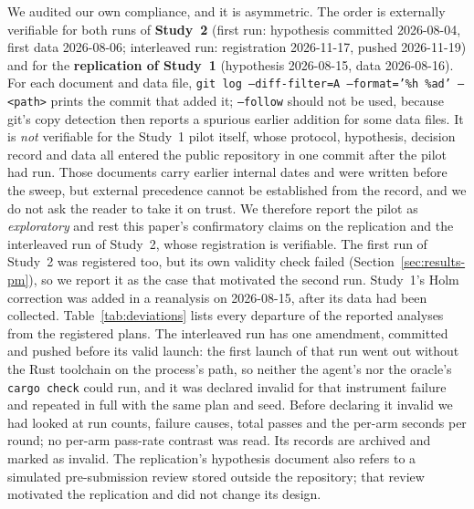 \documentclass[smallcondensed,natbib]{svjour3}
\begin{document}
We audited our own compliance, and it is asymmetric. The order is
externally verifiable for both runs of \textbf{Study~2} (first run:
hypothesis committed 2026-08-04, first data 2026-08-06; interleaved
run: registration 2026-11-17, pushed 2026-11-19) and for the
\textbf{replication of Study~1} (hypothesis 2026-08-15, data
2026-08-16). For each document
and data file, \texttt{git log --diff-filter=A --format='\%h \%ad'
-- <path>} prints the commit that added it; \texttt{--follow} should
not be used, because git's copy detection then reports a spurious
earlier addition for some data files. It is
\emph{not} verifiable for the Study~1 pilot itself, whose protocol,
hypothesis, decision record and data all entered the public
repository in one commit after the pilot had run. Those documents
carry earlier internal dates and were written before the sweep, but
external precedence cannot be established from the record, and we do
not ask the reader to take it on trust. We therefore report the
pilot as \emph{exploratory} and rest this paper's confirmatory claims
on the replication and the interleaved run of Study~2, whose
registration is verifiable. The first run of Study~2 was registered
too, but its own validity check failed (Section~\ref{sec:results-pm}),
so we report it as the case that motivated the second run.
Study~1's Holm correction was added in a reanalysis on 2026-08-15,
after its data had been collected. Table~\ref{tab:deviations} lists
every departure of the reported analyses from the registered plans.
The interleaved run has one amendment, committed and pushed before its
valid launch: the first launch of that run went out without the Rust
toolchain on the process's path, so neither the agent's nor the
oracle's \texttt{cargo check} could run, and it was declared invalid
for that instrument failure and repeated in full with the same plan
and seed. Before declaring it invalid we had looked at run counts,
failure causes, total passes and the per-arm seconds per round; no
per-arm pass-rate contrast was read. Its records are archived and
marked as invalid. The replication's hypothesis document also refers to a
simulated pre-submission review stored outside the repository; that
review motivated the replication and did not change its design.
\end{document}
